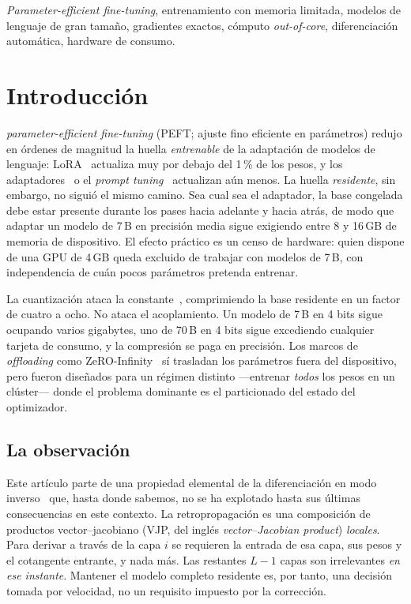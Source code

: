 \documentclass[journal]{IEEEtran}
\begin{document}
\begin{IEEEkeywords}
\emph{Parameter-efficient fine-tuning}, entrenamiento con memoria limitada, modelos de lenguaje de
gran tamaño, gradientes exactos, cómputo \emph{out-of-core}, diferenciación automática, hardware de
consumo.
\end{IEEEkeywords}

\section{Introducción}
\label{sec:intro}

 \emph{parameter-efficient fine-tuning} (PEFT; ajuste fino eficiente en
parámetros) redujo en órdenes de magnitud la huella \emph{entrenable} de la adaptación de modelos
de lenguaje: LoRA~\cite{hu2022lora} actualiza muy por debajo del 1\,\% de los pesos, y los
adaptadores~\cite{houlsby2019adapters} o el \emph{prompt tuning}~\cite{lester2021prompt}
actualizan aún menos. La huella \emph{residente}, sin embargo, no
siguió el mismo camino. Sea cual sea el adaptador, la base congelada debe estar presente durante
los pases hacia adelante y hacia atrás, de modo que adaptar un modelo de 7\,B en precisión media
sigue exigiendo entre 8 y 16\,GB de memoria de dispositivo. El efecto práctico es un censo de
hardware: quien dispone de una GPU de 4\,GB queda excluido de trabajar con modelos de 7\,B, con
independencia de cuán pocos parámetros pretenda entrenar.

La cuantización ataca la constante~\cite{dettmers2023qlora,dettmers2022int8}, comprimiendo la base
residente en un factor de cuatro a ocho. No ataca el acoplamiento. Un modelo de 7\,B en 4 bits
sigue ocupando varios gigabytes, uno de 70\,B en 4 bits sigue excediendo cualquier tarjeta de
consumo, y la compresión se paga en precisión. Los marcos de \emph{offloading} como
ZeRO-Infinity~\cite{rajbhandari2021zeroinfinity} sí trasladan los parámetros fuera del
dispositivo, pero fueron diseñados para un régimen distinto ---entrenar \emph{todos} los pesos en
un clúster--- donde el problema dominante es el particionado del estado del optimizador.

\subsection{La observación}

Este artículo parte de una propiedad elemental de la diferenciación en modo
inverso~\cite{griewank2008evaluating,baydin2018autodiff} que, hasta donde sabemos, no se ha
explotado hasta sus últimas consecuencias en este contexto. La retropropagación es una composición
de productos vector--jacobiano (VJP, del inglés \emph{vector--Jacobian product}) \emph{locales}.
Para derivar a través de la capa $i$ se
requieren la entrada de esa capa, sus pesos y el cotangente entrante, y nada más. Las restantes
$L-1$ capas son irrelevantes \emph{en ese instante}. Mantener el modelo completo residente es, por
tanto, una decisión tomada por velocidad, no un requisito impuesto por la corrección.
\end{document}
